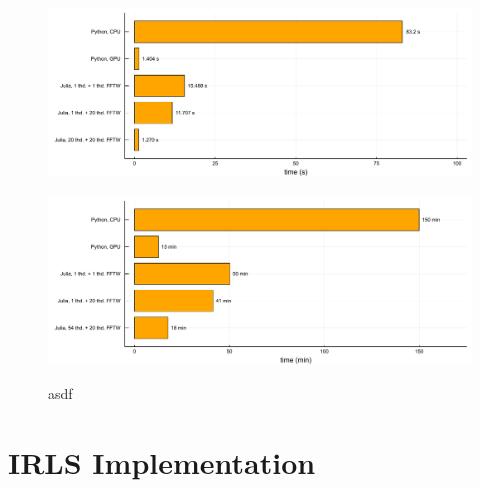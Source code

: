 \begin{figure}
    \centering
    \begin{minipage}{0.48\linewidth}
        \centering
        \includegraphics[width=\linewidth]{images/gridding_recon_speed.pdf}
        \label{fig:gridding_recon_speed}
    \end{minipage}
    \begin{minipage}{0.48\linewidth}
        \centering
        \includegraphics[width=\linewidth]{images/MSLR_recon_speed.pdf}
        \label{fig:MSLR_recon_speed}
    \end{minipage}
    \caption{asdf}
    \label{fig:3D_recon}
\end{figure}

\section{IRLS Implementation}


